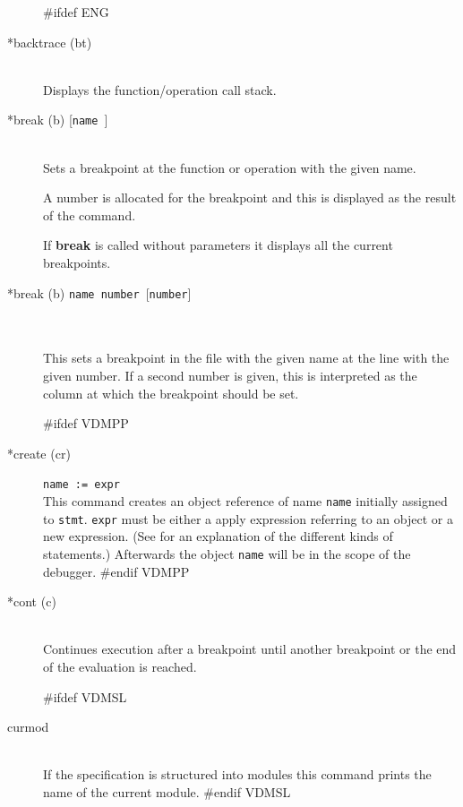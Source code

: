 \documentclass[\pformat,12pt]{article}
\begin{document}
\begin{description}

#ifdef ENG
\item[*backtrace (bt)] \mbox{}\\
  Displays the function/operation
  call stack.
\item[*break (b) \mbox{[{\tt name }]}] 
\mbox{}\\
  Sets a breakpoint at the function or
  operation with the given name.
  
    
    A number is allocated for the  breakpoint and this is displayed
    as the result of the command.

    If \textbf{break} is called without parameters it displays all the
    current breakpoints.

\item[*break (b) \mbox{\texttt{name number} [\texttt{number}]}]\mbox{}\\
\mbox{}\\
 This sets a breakpoint in the file with the given name at the line
 with the given number. If a second number is given, this is
 interpreted as the column at which the breakpoint should be set.
 
#ifdef VDMPP
\item[*create (cr)] {\tt name := expr}\mbox{}\\
  This command creates an object reference of name {\tt name}
  initially assigned to {\tt stmt}.  {\tt expr} must be either a
  apply expression referring to an object or a new expression. (See
  \cite{LangManPP-SCSK} for an explanation of the different kinds of
  statements.)  Afterwards the object {\tt name} will be in the scope
  of the debugger.
#endif VDMPP

\item[*cont (c)] \mbox{}\\
  Continues execution after a breakpoint until another breakpoint or
  the end of the evaluation is reached.

#ifdef VDMSL
\item[curmod] \mbox{}\\
  If the specification is structured into modules this command
  prints the name of the current module.
#endif VDMSL


\end{description}
\end{document}
